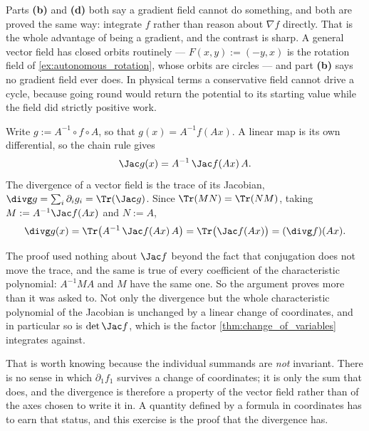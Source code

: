 \begin{exercisesolution}
\begin{remark}
Parts \textbf{(b)} and \textbf{(d)} both say a gradient field cannot do something, and both are
proved the same way: integrate $f$ rather than reason about $\nabla f$ directly. That is the
whole advantage of being a gradient, and the contrast is sharp. A general vector field has closed
orbits routinely --- $F(x,y) := (-y,x)$ is the rotation field of \cref{ex:autonomous_rotation},
whose orbits are circles --- and part \textbf{(b)} says no gradient field ever does. In physical
terms a conservative field cannot drive a cycle, because going round would return the potential
to its starting value while the field did strictly positive work.
\end{remark}
\end{exercisesolution}

\begin{exercisesolution}
\label{sol:divergence_under_conjugation}
Write $g := A^{-1}\circ f\circ A$, so that $g(x) = A^{-1}f(Ax)$. A linear map is its own
differential, so the chain rule gives
\[\Jac g(x) = A^{-1}\,\Jac f(Ax)\,A .\]
The divergence of a vector field is the trace of its Jacobian, $\divg g = \sum_i \partial_i g_i =
\Tr(\Jac g)$. Since $\Tr(MN) = \Tr(NM)$, taking $M := A^{-1}\Jac f(Ax)$ and $N := A$,
\[\divg g(x) = \Tr\big(A^{-1}\,\Jac f(Ax)\,A\big) = \Tr\big(\Jac f(Ax)\big) = (\divg f)(Ax) .\]

\begin{remark}
The proof used nothing about $\Jac f$ beyond the fact that conjugation does not move the trace,
and the same is true of every coefficient of the characteristic polynomial: $A^{-1}MA$ and $M$
have the same one. So the argument proves more than it was asked to. Not only the divergence but
the whole characteristic polynomial of the Jacobian is unchanged by a linear change of
coordinates, and in particular so is $\det \Jac f$, which is the factor
\cref{thm:change_of_variables} integrates against.

That is worth knowing because the individual summands are \emph{not} invariant. There is no sense
in which $\partial_1 f_1$ survives a change of coordinates; it is only the sum that does, and the
divergence is therefore a property of the vector field rather than of the axes chosen to write it
in. A quantity defined by a formula in coordinates has to earn that status, and this exercise is
the proof that the divergence has.
\end{remark}
\end{exercisesolution}


